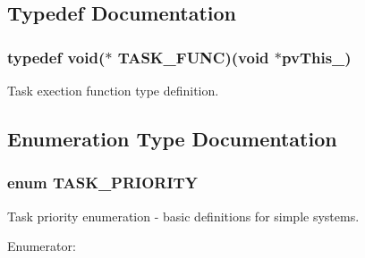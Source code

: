 \subsection{Typedef Documentation}
\subsubsection[{TASK\_\-FUNC}]{\setlength{\rightskip}{0pt plus 5cm}typedef void($\ast$ {\bf TASK\_\-FUNC})(void $\ast$pvThis\_\-)}\label{task_8h_aab2f44d369c601cc9cf9809d77e929f0}


Task exection function type definition. 

\subsection{Enumeration Type Documentation}
\subsubsection[{TASK\_\-PRIORITY}]{\setlength{\rightskip}{0pt plus 5cm}enum {\bf TASK\_\-PRIORITY}}\label{task_8h_a6e4ac6a7422b6a383b3b5384c4b1b1d2}


Task priority enumeration -\/ basic definitions for simple systems. \begin{Desc}
\item[Enumerator: ]\par
\begin{description}
\item[{\em 
TASK\_\-PRI\_\-IDLE\label{task_8h_a6e4ac6a7422b6a383b3b5384c4b1b1d2a6473ae5671075c4e67905236e2c769c7}
}]\item[{\em 
TASK\_\-PRI\_\-LOW\label{task_8h_a6e4ac6a7422b6a383b3b5384c4b1b1d2ab7f3735c8ee8c937aff9a3690f16c23e}
}]\item[{\em 
TASK\_\-PRI\_\-MED\label{task_8h_a6e4ac6a7422b6a383b3b5384c4b1b1d2ad1dc83ae5b544548c05f506611ef803f}
}]\item[{\em 
TASK\_\-PRI\_\-HIGH\label{task_8h_a6e4ac6a7422b6a383b3b5384c4b1b1d2a4773c80c0621d01ad752c94eb099e0c1}
}]\item[{\em 
TASK\_\-PRI\_\-MAX\label{task_8h_a6e4ac6a7422b6a383b3b5384c4b1b1d2a3691d94182325a826d1ef846b3f82e83}
}]\end{description}
\end{Desc}


